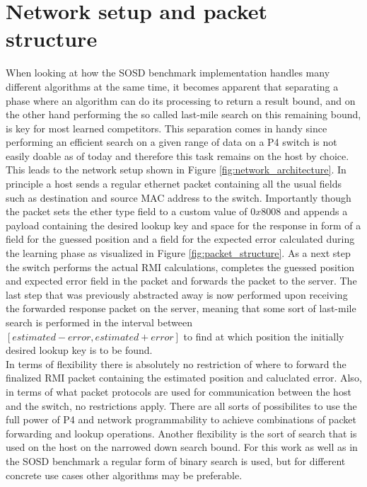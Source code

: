 \section{Network setup and packet structure}
\label{sect:rmionbmv2:network}
When looking at how the SOSD benchmark implementation handles many different algorithms at the same time, it becomes apparent that separating a phase where an algorithm can do its processing to return a result bound, and on the other hand performing the so called last-mile search on this remaining bound, is key for most learned competitors. This separation comes in handy since performing an efficient search on a given range of data on a P4 switch is not easily doable as of today and therefore this task remains on the host by choice. This leads to the network setup shown in Figure \ref{fig:network_architecture}. In principle a host sends a regular ethernet packet containing all the usual fields such as destination and source MAC address to the switch. Importantly though the packet sets the ether type field to a custom value of $0x8008$ and appends a payload containing the desired lookup key and space for the response in form of a field for the guessed position and a field for the expected error calculated during the learning phase as visualized in Figure \ref{fig:packet_structure}. As a next step the switch performs the actual RMI calculations, completes the guessed position and expected error field in the packet and forwards the packet to the server. The last step that was previously abstracted away is now performed upon receiving the forwarded response packet on the server, meaning that some sort of last-mile search is performed in the interval between \([estimated - error, estimated + error]\) to find at which position the initially desired lookup key is to be found.\\

In terms of flexibility there is absolutely no restriction of where to forward the finalized RMI packet containing the estimated position and caluclated error. Also, in terms of what packet protocols are used for communication between the host and the switch, no restrictions apply. There are all sorts of possibilites to use the full power of P4 and network programmability to achieve combinations of packet forwarding and lookup operations. Another flexibility is the sort of search that is used on the host on the narrowed down search bound. For this work as well as in the SOSD benchmark a regular form of binary search is used, but for different concrete use cases other algorithms may be preferable.

